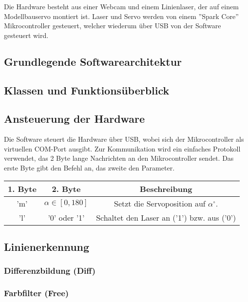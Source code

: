 \documentclass[ngerman,a4paper]{scrartcl}
\begin{document}
Die Hardware besteht aus einer Webcam und einem Linienlaser, der auf einem Modellbauservo montiert ist. Laser und Servo werden von einem ''Spark Core'' Mikrocontroller gesteuert, welcher wiederum über USB von der Software gesteuert wird.

\subsection{Grundlegende Softwarearchitektur}

\subsection{Klassen und Funktionsüberblick}

\subsection{Ansteuerung der Hardware}

Die Software steuert die Hardware über USB, wobei sich der Mikrocontroller als virtuellen COM-Port ausgibt. Zur Kommunikation wird ein einfaches Protokoll verwendet, das 2 Byte lange Nachrichten an den Mikrocontroller sendet. Das erste Byte gibt den Befehl an, das zweite den Parameter.\\

\begin{tabular}{|c|c|c|}
\hline
1. Byte & 2. Byte & Beschreibung \\
\hline
'm'\footnotemark & $\alpha \in [0,180]$ & Setzt die Servoposition auf $\alpha ^\circ$.\\
\hline
'l' & '0' oder '1' & Schaltet den Laser an ('1') bzw. aus ('0')\\
\hline
\end{tabular}



\subsection{Linienerkennung}

\subsubsection{Differenzbildung (Diff)}

\subsubsection{Farbfilter (Free)}
\end{document}
